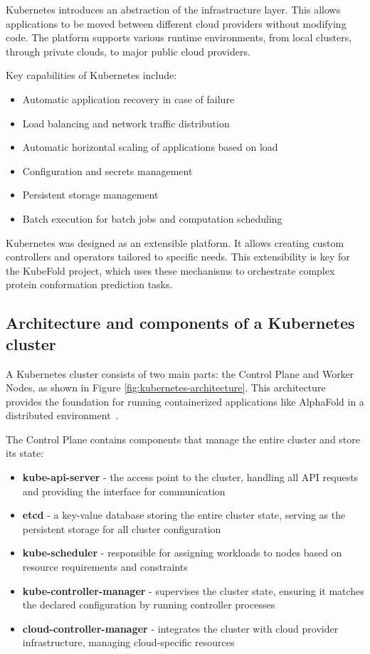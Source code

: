 Kubernetes introduces an abstraction of the infrastructure layer.
This allows applications to be moved between different cloud providers without modifying code.
The platform supports various runtime environments, from local clusters, through private clouds, to major public cloud providers.

Key capabilities of Kubernetes include:
\begin{itemize}
    \item Automatic application recovery in case of failure
    \item Load balancing and network traffic distribution
    \item Automatic horizontal scaling of applications based on load
    \item Configuration and secrets management
    \item Persistent storage management
    \item Batch execution for batch jobs and computation scheduling
\end{itemize}

Kubernetes was designed as an extensible platform.
It allows creating custom controllers and operators tailored to specific needs.
This extensibility is key for the KubeFold project, which uses these mechanisms to orchestrate complex protein conformation prediction tasks.

\subsection{Architecture and components of a Kubernetes cluster}

A Kubernetes cluster consists of two main parts: the Control Plane and Worker Nodes, as shown in Figure \ref{fig:kubernetes-architecture}. This architecture provides the foundation for running containerized applications like AlphaFold in a distributed environment~\cite{kubernetes}.

The Control Plane contains components that manage the entire cluster and store its state:
\begin{itemize}
    \item \textbf{kube-api-server} - the access point to the cluster, handling all API requests and providing the interface for communication
    \item \textbf{etcd} - a key-value database storing the entire cluster state, serving as the persistent storage for all cluster configuration
    \item \textbf{kube-scheduler} - responsible for assigning workloads to nodes based on resource requirements and constraints
    \item \textbf{kube-controller-manager} - supervises the cluster state, ensuring it matches the declared configuration by running controller processes
    \item \textbf{cloud-controller-manager} - integrates the cluster with cloud provider infrastructure, managing cloud-specific resources
\end{itemize}

